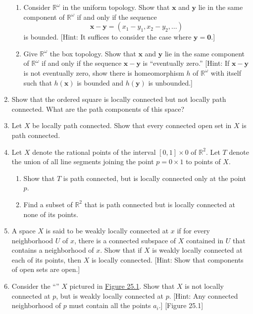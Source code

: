\begin{enumerate}[itemsep=0.4em, parsep=0pt, topsep=0pt, partopsep=0pt, leftmargin=*, label=\arabic*., ref=\arabic*]
\begin{enumerate}[itemsep=0.2em, parsep=0pt, topsep=0pt, partopsep=0pt, leftmargin=*, label=(\alph*), align=left]
 \item Consider \(\mathbb{R}^{\omega }\) in the uniform topology. Show that \(\mathbf{x}\) and \(\mathbf{y}\) lie in the same component of \(\mathbb{R}^{\omega }\) if and only if the sequence \[ \mathbf{x} - \mathbf{y} = ( {x_{1} - y_{1},x_{2} - y_{2},\ldots }) \] is bounded. [Hint: It suffices to consider the case where \(\mathbf{y} = \mathbf{0}\).]
 \item Give \(\mathbb{R}^{\omega }\) the box topology. Show that \(\mathbf{x}\) and \(\mathbf{y}\) lie in the same component of \(\mathbb{R}^{\omega }\) if and only if the sequence \(\mathbf{x} - \mathbf{y}\) is ``eventually zero.'' [Hint: If \(\mathbf{x} - \mathbf{y}\) is not eventually zero, show there is homeomorphism \(h\) of \(\mathbb{R}^{\omega }\) with itself such that \(h( \mathbf{x})\) is bounded and \(h( \mathbf{y})\) is unbounded.]
 \end{enumerate}
\item Show that the ordered square is locally connected but not locally path connected. What are the path components of this space?
\item Let \(X\) be locally path connected. Show that every connected open set in \(X\) is path connected.
\item Let \(X\) denote the rational points of the interval \([ {0,1}] \times 0\) of \(\mathbb{R}^{2}\). Let \(T\) denote the union of all line segments joining the point \(p = 0 \times 1\) to points of \(X\).
 \begin{enumerate}[itemsep=0.2em, parsep=0pt, topsep=0pt, partopsep=0pt, leftmargin=*, label=(\alph*), align=left]
 \item Show that \(T\) is path connected, but is locally connected only at the point \(p\).
 \item Find a subset of \(\mathbb{R}^{2}\) that is path connected but is locally connected at none of its points.
 \end{enumerate}
\item A space \(X\) is said to be weakly locally connected at \(x\) if for every neighborhood \(U\) of \(x\), there is a connected subspace of \(X\) contained in \(U\) that contains a neighborhood of \(x\). Show that if \(X\) is weakly locally connected at each of its points, then \(X\) is locally connected. [Hint: Show that components of open sets are open.]
\item Consider the ``'' \(X\) pictured in \hyperref[fig:25.1]{Figure 25.1}. Show that \(X\) is not locally connected at \(p\), but is weakly locally connected at \(p\). [Hint: Any connected neighborhood of \(p\) must contain all the points \(a_{i}\).] [Figure 25.1]

\end{enumerate}
